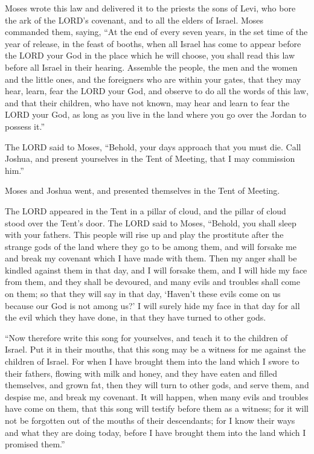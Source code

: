 \myverse{}Moses wrote this law and delivered it to the priests the sons
of Levi, who bore the ark of the LORD’s covenant, and to all the elders of Israel.
\myverse{}Moses commanded them, saying, “At the end of every seven years, in the set
time of the year of release, in the feast of booths,
\myverse{}when all Israel has come to appear before the LORD your God in the place
which he will choose, you shall read this law before all Israel in their hearing.
\myverse{}Assemble the people, the men and the women and the little ones, and the foreigners
who are within your gates, that they may hear, learn, fear the LORD your God, and observe to do all the
words of this law,
\myverse{}and that their children, who have not known, may hear and learn to fear the
LORD your God, as long as you live in the land where you go over the Jordan to possess it.”

\myverse{}The LORD said to Moses, “Behold, your days approach that you
must die. Call Joshua, and present yourselves in the Tent of Meeting, that I may commission him.”

Moses and Joshua went, and presented themselves in the Tent of Meeting.

\myverse{}The LORD appeared in the Tent in a pillar of cloud, and the
pillar of cloud stood over the Tent’s door.
\myverse{}The LORD said to Moses, “Behold, you shall sleep with your fathers. This
people will rise up and play the prostitute after the strange gods of the land where they go to be among
them, and will forsake me and break my covenant which I have made with them.
\myverse{}Then my anger shall be kindled against them in that day, and I will forsake
them, and I will hide my face from them, and they shall be devoured, and many evils and troubles shall
come on them; so that they will say in that day, ‘Haven’t these evils come on us because our God is not
among us?’
\myverse{}I will surely hide my face in that day for all the evil which they have done,
in that they have turned to other gods.

\myverse{}“Now therefore write this song for yourselves, and teach it
to the children of Israel. Put it in their mouths, that this song may be a witness for me against the
children of Israel.
\myverse{}For when I have brought them into the land which I swore to their fathers,
flowing with milk and honey, and they have eaten and filled themselves, and grown fat, then they will
turn to other gods, and serve them, and despise me, and break my covenant.
\myverse{}It will happen, when many evils and troubles have come on them, that this
song will testify before them as a witness; for it will not be forgotten out of the mouths of their descendants;
for I know their ways and what they are doing today, before I have brought them into the land which I
promised them.”

